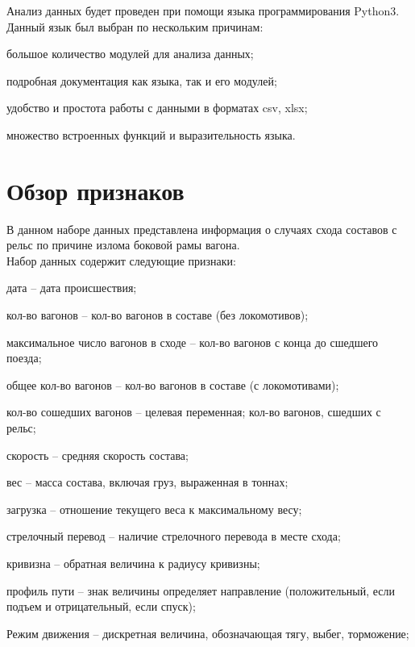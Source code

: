 Анализ данных будет проведен при помощи языка программирования Python3. Данный язык был выбран по нескольким причинам:
\begin{description}[font=$\bullet$]
\item большое количество модулей для анализа данных;
\item подробная документация как языка, так и его модулей;
\item удобство и простота работы с данными в форматах csv, xlsx;
\item множество встроенных функций и выразительность языка.
\end{description}



\section{Обзор признаков}
В данном наборе данных представлена информация о случаях схода составов с рельс по причине излома боковой рамы вагона.\\
Набор данных содержит следующие признаки:
\begin{description}[font=$\bullet$]
\item дата --  дата происшествия;
\item кол-во вагонов -- кол-во вагонов в составе (без локомотивов);
\item максимальное число вагонов в сходе -- кол-во вагонов с конца до сшедшего поезда;
\item общее кол-во вагонов -- кол-во вагонов в составе (с локомотивами);
\item кол-во сошедших вагонов -- целевая переменная; кол-во вагонов, сшедших с рельс;
\item скорость -- средняя скорость состава;
\item вес -- масса состава, включая груз, выраженная в тоннах;
\item загрузка -- отношение текущего веса к максимальному весу;
\item стрелочный перевод -- наличие стрелочного перевода в месте схода;
\item кривизна -- обратная величина к радиусу кривизны;
\item профиль пути -- знак величины определяет направление (положительный, если подъем и отрицательный, если спуск);
\item Режим движения -- дискретная величина, обозначающая тягу, выбег, торможение;\\
\end{description}

